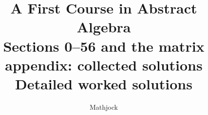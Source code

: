 
\title{\textbf{A First Course in Abstract Algebra}\\[0.3em]Sections 0--56 and the matrix appendix: collected solutions\\[0.3em]\large Detailed worked solutions}
\author{Mathjock}
\date{}

\maketitle
\bookinfo
\tableofcontents
\clearpage
\renewcommand{\thesection}{0}
\renewcommand{\theHsection}{fraleigh.0}

\clearpage
\renewcommand{\thesection}{1}
\renewcommand{\theHsection}{fraleigh.1}

\clearpage
\renewcommand{\thesection}{2}
\renewcommand{\theHsection}{fraleigh.2}

\clearpage
\renewcommand{\thesection}{3}
\renewcommand{\theHsection}{fraleigh.3}

\clearpage
\renewcommand{\thesection}{4}
\renewcommand{\theHsection}{fraleigh.4}

\clearpage
\renewcommand{\thesection}{5}
\renewcommand{\theHsection}{fraleigh.5}

\clearpage
\renewcommand{\thesection}{6}
\renewcommand{\theHsection}{fraleigh.6}

\clearpage
\renewcommand{\thesection}{7}
\renewcommand{\theHsection}{fraleigh.7}

\clearpage
\renewcommand{\thesection}{8}
\renewcommand{\theHsection}{fraleigh.8}

\clearpage
\renewcommand{\thesection}{9}
\renewcommand{\theHsection}{fraleigh.9}

\clearpage
\renewcommand{\thesection}{10}
\renewcommand{\theHsection}{fraleigh.10}

\clearpage
\renewcommand{\thesection}{11}
\renewcommand{\theHsection}{fraleigh.11}

\clearpage
\renewcommand{\thesection}{12}
\renewcommand{\theHsection}{fraleigh.12}

\clearpage
\renewcommand{\thesection}{13}
\renewcommand{\theHsection}{fraleigh.13}

\clearpage
\renewcommand{\thesection}{14}
\renewcommand{\theHsection}{fraleigh.14}

\clearpage
\renewcommand{\thesection}{15}
\renewcommand{\theHsection}{fraleigh.15}

\clearpage
\renewcommand{\thesection}{16}
\renewcommand{\theHsection}{fraleigh.16}

\clearpage
\renewcommand{\thesection}{17}
\renewcommand{\theHsection}{fraleigh.17}

\clearpage
